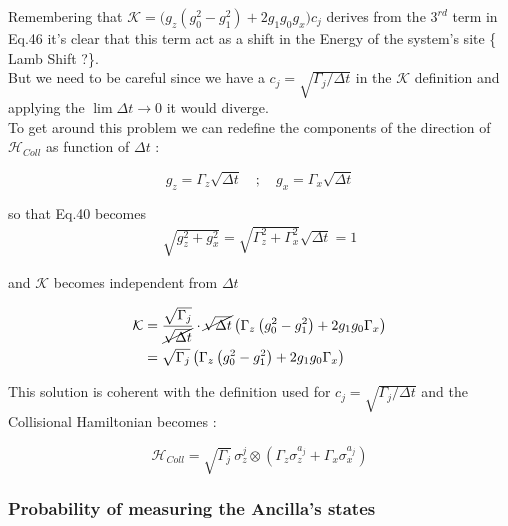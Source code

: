 \documentclass[a4paper,12pt]{article}
\begin{document}
Remembering that $ \mathcal{K} = \Big( g_{z}\left(g_{0}^{2} - g_{1}^{2} \right) + 2 g_{1} g_{0} g_{x} \Big) c_j $ derives from the $ 3^{rd} $ term in Eq.46 it's clear that this term act as a shift in the Energy of the system's site \{ Lamb Shift ?\}. \\
But we need to be careful since we have a $ c_j = \sqrt{\Gamma_j / \Delta t} $ in the $ \mathcal{K} $ definition and applying the $ \lim \Delta t \rightarrow 0 $ it would diverge. \\
To get around this problem we can redefine the components of the direction of $ \mathcal{H}_{Coll} $ as function of $ \Delta t $ :

\begin{equation}
	g_z = \Gamma_{z} \sqrt{\Delta t} \quad ; \quad g_x = \Gamma_{x} \sqrt{\Delta t}
	\label{eq:gz_gx_reformulation}
\end{equation}

so that Eq.40 becomes
\begin{align}
	\sqrt{g_{z}^{2} + g_{x}^{2}} = \sqrt{\Gamma_{z}^{2} + \Gamma_{x}^{2} } \sqrt{\Delta t} = 1
	\label{eq:geom_constrain}
\end{align}

and $ \mathcal{K} $ becomes independent from $ \Delta t $

\begin{align}
	\mathcal{K} &= \frac{\sqrt{\Gamma_{j}}}{\cancel{\sqrt{\Delta t}}} \cdot \cancel{\sqrt{\Delta t}} \left( \Gamma_{z}\left(g_{0}^{2} - g_{1}^{2} \right) + 2 g_{1} g_{0} \Gamma_{x}\right) \notag \\
	&= \sqrt{\Gamma_{j}} \left( \Gamma_{z}\left(g_{0}^{2} - g_{1}^{2} \right) + 2 g_{1} g_{0} \Gamma_{x}\right)
	\label{eq:K_term_refomrulation}
\end{align}

This solution is coherent with the definition used for $ c_j = \sqrt{\Gamma_j / \Delta t} $ and the Collisional Hamiltonian becomes :

\begin{equation}
	\mathcal{H}_{Coll} = \sqrt{\Gamma_{j}} \, \sigma_{z}^{j} \otimes \left( \Gamma_{z} \sigma_{z}^{a_j} + \Gamma_{x} \sigma_{x}^{a_j} \right)
	\label{eq:H_coll_refomrulation}
\end{equation}

\subsubsection{Probability of measuring the Ancilla's states}
\end{document}
